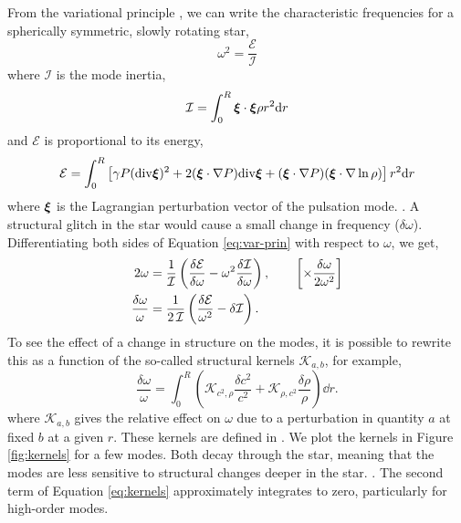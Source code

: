 From the variational principle \citep{Chandrasekhar1939,Chandrasekhar1964}, we can write the characteristic frequencies for a spherically symmetric, slowly rotating star,
%
\begin{equation}
    \omega^2 = \frac{\mathcal{E}}{\mathcal{I}}\label{eq:var-prin}
\end{equation}
%
where \(\mathcal{I}\) is the mode inertia,
%
\begin{equation}
    \mathcal{I} = \int_0^R \bm{\xi} \cdot \bm{\xi} \rho r^2 \mathrm{d} r
\end{equation}
%
and \(\mathcal{E}\) is proportional to its energy,
%
\begin{equation}
    \mathcal{E} = \int_0^R \left[\gamma P (\mathrm{div} \bm{\xi})^2 + 2(\bm{\xi}\cdot \nabla P) \mathrm{div} \bm{\xi} + (\bm{\xi}\cdot \nabla P) (\bm{\xi}\cdot\nabla\ln\rho)\right] r^2 \mathrm{d} r
\end{equation}
%
where \(\bm{\xi}\) is the Lagrangian perturbation vector of the pulsation mode. . A structural glitch in the star would cause a small change in frequency (\(\delta\omega\)). Differentiating both sides of Equation \ref{eq:var-prin} with respect to \(\omega\), we get,
%
\begin{align}
    2\omega &= \frac{1}{\mathcal{I}} \left( \frac{\delta\mathcal{E}}{\delta\omega} - \omega^2 \frac{\delta\mathcal{I}}{\delta\omega}\right), \qquad \left[\times \frac{\delta\omega}{2\omega^2}\right] \notag \\
    \frac{\delta\omega}{\omega} &= \frac{1}{2\,\mathcal{I}} \left(\frac{\delta\mathcal{E}}{\omega^2} - \delta\mathcal{I}\right).
\end{align}
%
To see the effect of a change in structure on the modes, it is possible to rewrite this as a function of the so-called structural kernels \(\mathcal{K}_{a,b}\), for example,
%
\begin{equation}
    \frac{\delta\omega}{\omega} = \int_0^R \left(\mathcal{K}_{c^2,\rho} \frac{\delta c^2}{c^2} + \mathcal{K}_{\rho,c^2} \frac{\delta \rho}{\rho} \right) \dd r.\label{eq:kernels}
\end{equation}
%
where \(\mathcal{K}_{a, b}\) gives the relative effect on \(\omega\) due to a perturbation in quantity \(a\) at fixed \(b\) at a given \(r\). These kernels are defined in \citet{Gough.Thompson1991}. We plot the kernels in Figure \ref{fig:kernels} for a few modes. Both decay through the star, meaning that the modes are less sensitive to structural changes deeper in the star. . The second term of Equation \ref{eq:kernels} approximately integrates to zero, particularly for high-order modes. 

